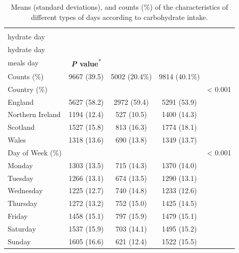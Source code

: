 \begin{table}
	
	\caption{\label{tab:day-level-features}Means (standard deviations), and counts (\%) of the characteristics of different types of days according to carbohydrate intake.}
	\centering
	\fontsize{9}{11}\selectfont
	\begin{tabular}[t]{lcccc}
		\hiderowcolors
		\toprule
		& \textbf{\Centerstack{High carbo-\\hydrate day}} & \textbf{\Centerstack{Low carbo-\\hydrate day}} & \textbf{\Centerstack{Regular\\meals day}} & \textbf{\textit{P} value}\textsuperscript{*}\\
		\midrule
		\showrowcolors
		Counts (\%) & 9667 (39.5) & 5002 (20.4\%) & 9814 (40.1\%) & \\
		Country (\%) &  &  &  & < 0.001\\
		\hspace{1em}England & 5627 (58.2) & 2972 (59.4) & 5291 (53.9) & \\
		\hspace{1em}Northern Ireland & 1194 (12.4) & 527 (10.5) & 1400 (14.3) & \\
		\hspace{1em}Scotland & 1527 (15.8) & 813 (16.3) & 1774 (18.1) & \\
		\hspace{1em}Wales & 1318 (13.6) & 690 (13.8) & 1349 (13.7) & \\
		Day of Week (\%) &  &  &  & < 0.001\\
		\hspace{1em}Monday & 1303 (13.5) & 715 (14.3) & 1370 (14.0) & \\
		\hspace{1em}Tuesday & 1266 (13.1) & 674 (13.5) & 1290 (13.1) & \\
		\hspace{1em}Wednesday & 1225 (12.7) & 740 (14.8) & 1233 (12.6) & \\
		\hspace{1em}Thursday & 1272 (13.2) & 752 (15.0) & 1425 (14.5) & \\
		\hspace{1em}Friday & 1458 (15.1) & 797 (15.9) & 1479 (15.1) & \\
		\hspace{1em}Saturday & 1537 (15.9) & 703 (14.1) & 1495 (15.2) & \\
		\hspace{1em}Sunday & 1605 (16.6) & 621 (12.4) & 1522 (15.5) & \\

\end{tabular}
\end{table}
